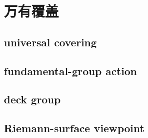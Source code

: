 \section{万有覆盖}
\label{b3:sec:1103}


\subsection{universal covering}
\label{b3:subsec:110301}

\subsection{fundamental-group action}
\label{b3:subsec:110302}

\subsection{deck group}
\label{b3:subsec:110303}

\subsection{Riemann-surface viewpoint}
\label{b3:subsec:110304}


